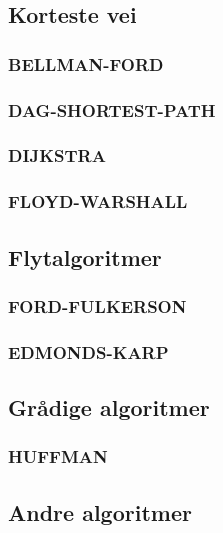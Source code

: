 \subsection{Korteste vei}
\subsubsection{BELLMAN-FORD}
\subsubsection{DAG-SHORTEST-PATH}
\subsubsection{DIJKSTRA}
\subsubsection{FLOYD-WARSHALL}
\subsection{Flytalgoritmer}
\subsubsection{FORD-FULKERSON}
\subsubsection{EDMONDS-KARP}
\subsection{Grådige algoritmer}
\subsubsection{HUFFMAN}
\subsection{Andre algoritmer}